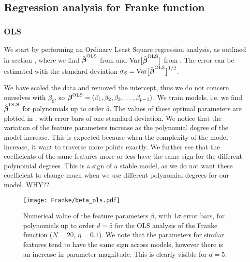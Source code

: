     \subsection{Regression analysis for Franke function}\label{sec:reganalysis_franke}

        \subsubsection{OLS}\label{sec:olsanalysis}
            We start by performing an Ordinary Least Square regression analysis, as outlined in section , where we find $\hat{\boldsymbol{\beta}}^\text{OLS}$ from  and $\text{Var}\big[\hat{\boldsymbol{\beta}}^{\text{OLS}}\big]$ from . The error can be estimated with the standard deviation $\mathbf{\sigma}_{\beta} = \text{Var}\big[\hat{\boldsymbol{\beta}}^{\text{OLS}}\big]^{1/2}$. 

            We have scaled the data and removed the intercept, thus we do not concern ourselves with $\beta_0$, so $\boldsymbol{\beta}^{\text{OLS}} = (\beta_1, \beta_2, \beta_3, \dots, \beta_{p-1})$. We train models, i.e. we find $\hat{\boldsymbol{\beta}}^{\text{OLS}}$ for polynomials up to order $5$. The values of these optimal parameters are plotted in , with error bars of one standard deviation. We notice that the variation of the feature parameters increase as the polynomial degree of the model increase. This is expected because when the complexity of the model increase, it want to traverse more points exactly. We further see that the coefficients of the same features more or less have the same sign for the different polynomial degrees. This is a sign of a stable model, as we do not want these coefficient to change much when we use different polynomial degrees for our model. WHY??

            \begin{figure}
                \texttt{[image: Franke/beta\_ols.pdf]}
                \caption{Numerical value of the feature parameters $\beta$, with 1$\sigma$ error bars, for polynomials up to order $d=5$ for the OLS analysis of the Franke function ($N=20$, $\eta=0.1$). We note that the parameters for similar features tend to have the same sign across models, however there is an increase in parameter magnitude. This is clearly visible for $d=5$. }
                \label{fig:beta_with_standard_deviation}
            \end{figure}

